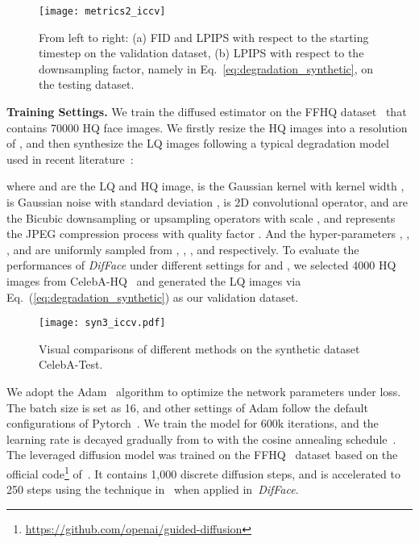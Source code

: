 \documentclass[10pt,twocolumn,letterpaper]{article}
\begin{document}
\begin{figure}[t]
    \centering
    \texttt{[image: metrics2\_iccv]}
    \caption{From left to right: (a) FID and LPIPS with respect to the starting timestep  on the validation dataset, (b) LPIPS with respect to the downsampling factor, namely  in Eq.~\eqref{eq:degradation_synthetic}, on the testing dataset.}
    \label{fig:fid_lpips}
\end{figure}
\noindent\textbf{Training Settings.} We train the diffused estimator  on the FFHQ dataset~\cite{karras2019style} that contains 70000 HQ face images. We firstly resize the HQ images into a resolution of , and then synthesize the LQ images following a typical degradation model used in recent literature~\cite{wang2021towards}:

where  and  are the LQ and HQ image,  is the Gaussian kernel with kernel width ,  is Gaussian noise with standard deviation ,  is 2D convolutional operator,  and  are the Bicubic downsampling or upsampling operators with scale , and  represents the JPEG compression process with quality factor . And the hyper-parameters , , , and  are uniformly sampled from , , , and  respectively. To evaluate the performances of \textit{DifFace} under different settings for  and , we selected 4000 HQ images from CelebA-HQ~\cite{karras2018progressive} and generated the LQ images via Eq.~(\ref{eq:degradation_synthetic}) as our validation dataset.
\begin{figure*}[t]
    \centering
    \texttt{[image: syn3\_iccv.pdf]}
    \caption{Visual comparisons of different methods on the synthetic dataset CelebA-Test.}
    \label{fig:syn}
    \vspace{-2mm}
\end{figure*}

We adopt the Adam~\cite{kingma2015adam} algorithm to optimize the network parameters  under  loss. The batch size is set as 16, and other settings of Adam follow the default configurations of Pytorch~\cite{paszke2019pytorch}. We train the model for 600k iterations, and the learning rate is decayed gradually from  to  with the cosine annealing schedule~\cite{DBLP:conf/iclr/LoshchilovH17}. The leveraged diffusion model was trained on the FFHQ~\cite{karras2018progressive} dataset based on the official code\footnote{\url{https://github.com/openai/guided-diffusion}} of~\cite{dhariwal2021diffusion}. It contains 1,000 discrete diffusion steps, and is accelerated to 250 steps using the technique in~\cite{nichol2021improved} when applied in~\textit{DifFace}.
\end{document}
